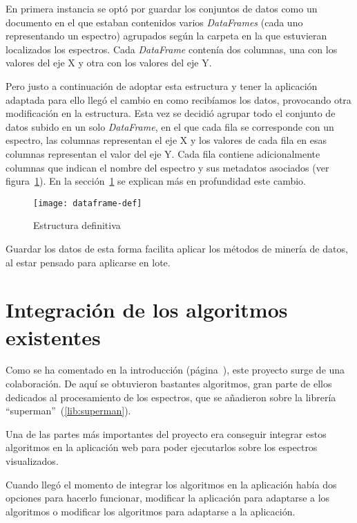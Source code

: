 En primera instancia se optó por guardar los conjuntos de datos como un
documento en el que estaban contenidos varios \textit{DataFrames} (cada uno
representando un espectro) agrupados según la carpeta en la que estuvieran
localizados los espectros. Cada \textit{DataFrame} contenía dos columnas, una
con los valores del eje X y otra con los valores del eje Y.

Pero justo a continuación de adoptar esta estructura y tener la aplicación
adaptada para ello llegó el cambio en como recibíamos los datos, provocando otra
modificación en la estructura. Esta vez se decidió agrupar todo el conjunto de
datos subido en un solo \textit{DataFrame}, en el que cada fila se corresponde
con un espectro, las columnas representan el eje X y los valores de cada fila en
esas columnas representan el valor del eje Y. Cada fila contiene adicionalmente
columnas que indican el nombre del espectro y sus metadatos asociados (ver
figura~\ref{fig:dataframe-def}). En la sección~\ref{sec:integracion} se explican
más en profundidad este cambio.

\begin{figure}[!h]
	\centering
	\texttt{[image: dataframe-def]}
	\caption{Estructura definitiva}\label{fig:dataframe-def}
\end{figure}

Guardar los datos de esta forma facilita aplicar los métodos de minería de datos,
al estar pensado para aplicarse en lote.


\section{Integración de los algoritmos existentes}\label{sec:integracion}

Como se ha comentado en la introducción (página~\pageref{ch:introduccion}), este
proyecto surge de una colaboración. De aquí se obtuvieron bastantes algoritmos,
gran parte de ellos dedicados al procesamiento de los espectros, que se
añadieron sobre la librería ``superman''~(\ref{lib:superman}).

Una de las partes más importantes del proyecto era conseguir integrar estos
algoritmos en la aplicación web para poder ejecutarlos sobre los espectros
visualizados.

Cuando llegó el momento de integrar los algoritmos en la aplicación había dos
opciones para hacerlo funcionar, modificar la aplicación para adaptarse a los
algoritmos o modificar los algoritmos para adaptarse a la aplicación.


